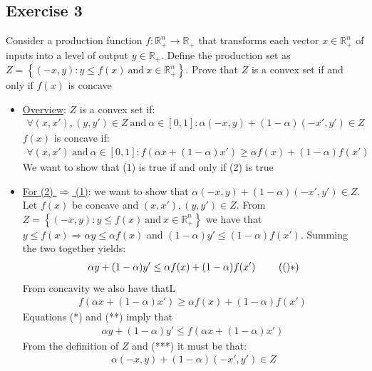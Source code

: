 \documentclass{article}
\begin{document}
\subsection{Exercise 3}
Consider a production function $f: \mathbb{R}_{+}^{n} \rightarrow \mathbb{R}_{+}$ that transforms each vector $x \in \mathbb{R}^{n}_{+}$ of inputs into a level of output $y \in \mathbb{R}_{+}$. Define the production set as $Z = \left\{ (-x,y): y \leq f(x) \ \text{and} \ x \in \mathbb{R}_{+}^{n} \right\}$. Prove that $Z$ is a convex set if and only if $f(x)$ is concave \par \vspace{0.3em}
  \begin{itemize}
    \item  \underline{Overview}: $Z$ is a convex set if:
    \begin{gather*}
      \forall (x,x'),(y,y') \in Z \ \text{and} \ \alpha \in [0,1]: \alpha (-x,y) + (1-\alpha)(-x',y') \in Z \ \tag{1}
    \end{gather*}
    $f(x)$ is concave if:
    \begin{gather*}
      \forall (x,x') \ \text{and} \ \alpha \in [0,1]: f(\alpha x + (1-\alpha)x') \geq \alpha f(x) + (1-\alpha)f(x') \ \tag{2}
    \end{gather*}
    We want to show that (1) is true if and only if (2) is true
    \item  \underline{For (2) $\Rightarrow$ (1)}: we want to show that $\alpha (-x,y) + (1-\alpha)(-x',y') \in Z$. Let $f(x)$ be concave and $(x,x'),(y,y') \in Z$. From $Z = \left\{ (-x,y): y \leq f(x) \ \text{and} \ x \in \mathbb{R}_{+}^{n} \right\}$ we have that $y \leq f(x) \Rightarrow \alpha y \leq \alpha f(x)$ and $(1 - \alpha)y' \leq (1-\alpha)f(x')$. Summing the two together yields:
    \begin{gather*}
      \alpha y + (1-\alpha)y' \leq \alpha f(x) + (1- \alpha)f(x') \ \tag(*)
    \end{gather*}
    From concavity we also have thatL
    \begin{gather*}
      f(\alpha x + (1-\alpha)x') \geq \alpha f(x) + (1-\alpha)f(x') \ \tag{**}
    \end{gather*}
    Equations (*) and (**) imply that
    \begin{gather*}
      \alpha y + (1-\alpha)y' \leq f(\alpha x + (1-\alpha)x') \ \tag{***}
    \end{gather*}
    From the definition of $Z$ and (***) it must be that:
    \begin{gather*}
      \alpha (-x,y) + (1-\alpha)(-x',y') \in Z

\end{gather*}
\end{itemize}
\end{document}
